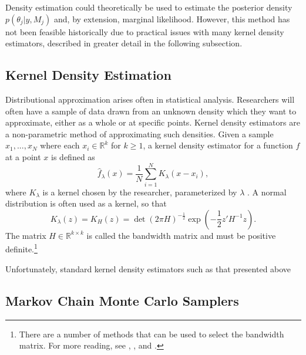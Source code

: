 \documentclass[twocolumn]{article}
\newcommand{\RR}{\mathbb{R}}
\begin{document}
Density estimation could theoretically be used to estimate the posterior density $p(\theta_j|y, M_j)$ and, by extension, marginal likelihood. However, this method has not been feasible historically due to practical issues with many kernel density estimators, described in greater detail in the following subsection.

\subsection{Kernel Density Estimation}


Distributional approximation arises often in statistical analysis. Researchers will often have a sample of data drawn from an unknown density which they want to approximate, either as a whole or at specific points. Kernel density estimators are a non-parametric method of approximating such densities. Given a sample $x_1, ..., x_N$ where each $x_i\in\RR^k$ for $k\geq1$, a kernel density estimator for a function $f$ at a point $x$ is defined as
\begin{equation}
	\hat{f}_\lambda(x) = \frac{1}{N}\sum_{i=1}^N K_\lambda(x - x_i),
\end{equation}
where $K_\lambda$ is a kernel chosen by the researcher, parameterized by $\lambda$ \citep{SilvermanDE}. A normal distribution is often used as a kernel, so that
\begin{equation}
	K_\lambda(z) = K_H(z) = \det(2\pi H)^{-\frac12} \exp\left(-\frac12 z' H^{-1} z\right).
\end{equation}
The matrix $H\in\RR^{k\times k}$ is called the bandwidth matrix and must be positive definite.\footnote{There are a number of methods that can be used to select the bandwidth matrix. For more reading, see \cite{SilvermanDE}, \cite{Scott}, and \cite{SheatherJones}.}

Unfortunately, standard kernel density estimators such as that presented above

\subsection{Markov Chain Monte Carlo Samplers}
\end{document}
